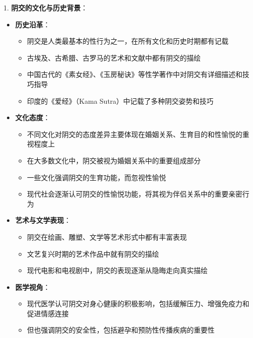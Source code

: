 \documentclass[12pt,UTF8]{ctexbook}
\begin{document}
1. \textbf{阴交的文化与历史背景}：
\begin{itemize}
	\item \textbf{历史沿革}：
	\begin{itemize}
		\item 阴交是人类最基本的性行为之一，在所有文化和历史时期都有记载
		\item 古埃及、古希腊、古罗马的艺术和文献中都有阴交的描绘
		\item 中国古代的《素女经》、《玉房秘诀》等性学著作中对阴交有详细描述和技巧指导
		\item 印度的《爱经》（Kama Sutra）中记载了多种阴交姿势和技巧
	\end{itemize}
	\item \textbf{文化态度}：
	\begin{itemize}
		\item 不同文化对阴交的态度差异主要体现在婚姻关系、生育目的和性愉悦的重视程度上
		\item 在大多数文化中，阴交被视为婚姻关系中的重要组成部分
		\item 一些文化强调阴交的生育功能，而忽视性愉悦
		\item 现代社会逐渐认可阴交的性愉悦功能，将其视为伴侣关系中的重要亲密行为
	\end{itemize}
	\item \textbf{艺术与文学表现}：
	\begin{itemize}
		\item 阴交在绘画、雕塑、文学等艺术形式中都有丰富表现
		\item 文艺复兴时期的艺术作品中就有阴交的描绘
		\item 现代电影和电视剧中，阴交的表现逐渐从隐晦走向真实描绘
	\end{itemize}
	\item \textbf{医学视角}：
	\begin{itemize}
		\item 现代医学认可阴交对身心健康的积极影响，包括缓解压力、增强免疫力和促进情感连接
		\item 但也强调阴交的安全性，包括避孕和预防性传播疾病的重要性
	\end{itemize}
\end{itemize}
\end{document}
